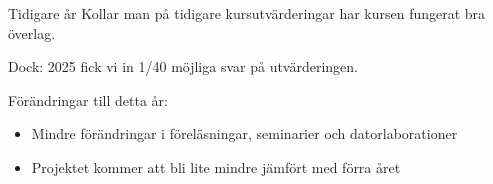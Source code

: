 \documentclass[
  10pt,
  ignorenonframetext,
]{beamer}
\providecommand{\tightlist}{%
  \setlength{\itemsep}{0pt}\setlength{\parskip}{0pt}}
\begin{document}
\begin{frame}{Tidigare år}
\protect\hypertarget{tidigare-uxe5r}{}
Kollar man på tidigare kursutvärderingar har kursen fungerat bra överlag. 

Dock: 2025 fick vi in 1/40 möjliga svar på utvärderingen.

\begin{block}{Förändringar till detta år:}
\protect\hypertarget{fuxf6ruxe4ndringar-till-detta-uxe5r}{}
\begin{itemize}
\tightlist
\item
  Mindre förändringar i föreläsningar, seminarier och datorlaborationer
\item 
  Projektet kommer att bli lite mindre jämfört med förra året
\end{itemize}
\end{block}
\end{frame}
\end{document}
